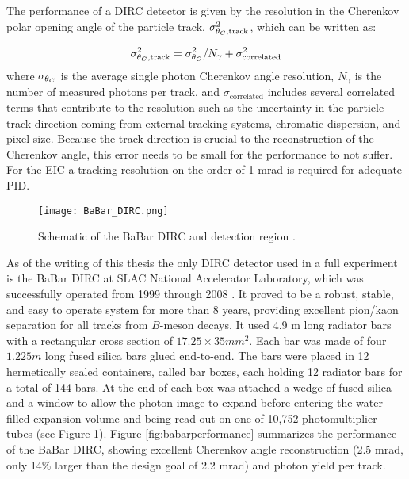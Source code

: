 The performance of a DIRC detector is given by the resolution in the Cherenkov polar opening angle of the particle track, $\sigma_{\theta_{C},\text{track}}^2$, which can be written as:

\begin{equation}
	\sigma_{\theta_{C},\text{track}}^2 = \sigma_{\theta_{C}}^2 / N_{\gamma} + \sigma_{\text{correlated}}^2
	\label{eq:performance}
\end{equation}
%
where $\sigma_{\theta_{C}}$ is the average single photon Cherenkov angle resolution, $N_{\gamma}$ is the number of measured photons per track, and $\sigma_{\text{correlated}}$ includes several correlated terms that contribute to the resolution such as the uncertainty in the particle track direction coming from external tracking systems, chromatic dispersion, and pixel size. Because the track direction is crucial to the reconstruction of the Cherenkov angle, this error needs to be small for the performance to not suffer. For the EIC a tracking resolution on the order of 1 mrad is required for adequate PID.

\begin{figure}[!htb]
	\centering
	\texttt{[image: BaBar\_DIRC.png]}
	\caption[Schematic of the BaBar DIRC and detection region.]{Schematic of the BaBar DIRC and detection region \cite{BaBarDIRC}.}
	\label{fig:babardirc}
\end{figure}

As of the writing of this thesis the only DIRC detector used in a full experiment is the BaBar DIRC at SLAC National Accelerator Laboratory, which was successfully operated from 1999 through 2008 \cite{BaBarDIRC}. It proved to be a robust, stable, and easy to operate system for more than 8 years, providing excellent pion/kaon separation for all tracks from $B$-meson decays. It used 4.9 m long radiator bars with a rectangular cross section of $17.25 \times 35 \unit{mm}^2$. Each bar was made of four $1.225\unit{m}$ long fused silica bars glued end-to-end. The bars were placed in 12 hermetically sealed containers, called bar boxes, each holding 12 radiator bars for a total of 144 bars. At the end of each box was attached a wedge of fused silica and a window to allow the photon image to expand before entering the water-filled expansion volume and being read out on one of 10,752 photomultiplier tubes (see Figure \ref{fig:babardirc}). Figure \ref{fig:babarperformance} summarizes the performance of the BaBar DIRC, showing excellent Cherenkov angle reconstruction (2.5 mrad, only 14\% larger than the design goal of 2.2 mrad) and photon yield per track.

